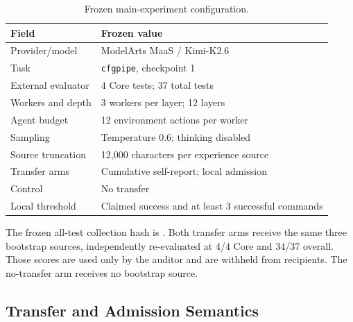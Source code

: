 \documentclass[letterpaper]{article}
\begin{document}
\begin{table}[t]
\centering
\caption{Frozen main-experiment configuration.}
\label{tab:supp-main-config}
\small
\begin{tabular}{p{}p{}}
\toprule
Field & Frozen value \\
\midrule
Provider/model & ModelArts MaaS / Kimi-K2.6 \\
Task & \texttt{cfgpipe}, checkpoint 1 \\
External evaluator & 4 Core tests; 37 total tests \\
Workers and depth & 3 workers per layer; 12 layers \\
Agent budget & 12 environment actions per worker \\
Sampling & Temperature 0.6; thinking disabled \\
Source truncation & 12,000 characters per experience source \\
Transfer arms & Cumulative self-report; local admission \\
Control & No transfer \\
Local threshold & Claimed success and at least 3 successful commands \\
\bottomrule
\end{tabular}
\end{table}

The frozen all-test collection hash is
{\ttfamily\small{}}.
Both transfer arms receive the same three bootstrap sources, independently
re-evaluated at 4/4 Core and 34/37 overall. Those scores are used only by the
auditor and are withheld from recipients. The no-transfer arm receives no
bootstrap source.

\clearpage
\subsection{Transfer and Admission Semantics}
\end{document}

